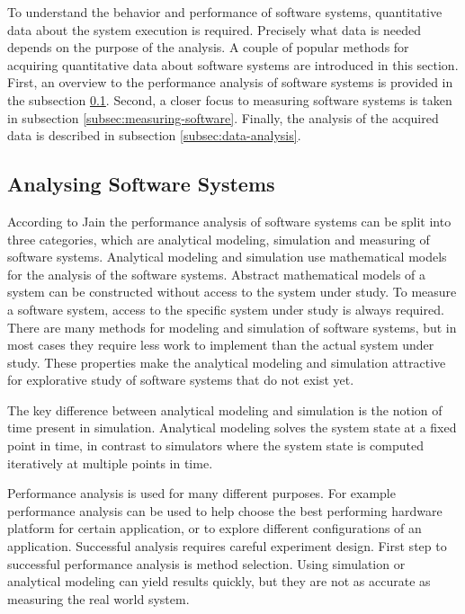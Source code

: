 To understand the behavior and performance of software systems, quantitative data about the system execution is required. Precisely what data is needed depends on the purpose of the analysis. A couple of popular methods for acquiring quantitative data about software systems are introduced in this section. First, an overview to the performance analysis of software systems is provided in the subsection \ref{subsec:analysing-software}. Second, a closer focus to measuring software systems is taken in subsection \ref{subsec:measuring-software}. Finally, the analysis of the acquired data is described in subsection \ref{subsec:data-analysis}.

\subsection{Analysing Software Systems}
\label{subsec:analysing-software}
According to Jain \cite{jain1991art} the performance analysis of software systems can be split into three categories, which are analytical modeling, simulation and measuring of software systems. Analytical modeling and simulation use mathematical models for the analysis of the software systems. Abstract mathematical models of a system can be constructed without access to the system under study. To measure a software system, access to the specific system under study is always required. There are many methods for modeling and simulation of software systems, but in most cases they require less work to implement than the actual system under study. These properties make the analytical modeling and simulation attractive for explorative study of software systems that do not exist yet.~\cite{jain1991art}

The key difference between analytical modeling and simulation is the notion of time present in simulation. Analytical modeling solves the system state at a fixed point in time, in contrast to simulators where the system state is computed iteratively at multiple points in time.~\cite{jain1991art}

Performance analysis is used for many different purposes. For example performance analysis can be used to help choose the best performing hardware platform for certain application, or to explore different configurations of an application. Successful analysis requires careful experiment design. First step to successful performance analysis is method selection. Using simulation or analytical modeling can yield results quickly, but they are not as accurate as measuring the real world system.~\cite{jain1991art}

